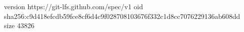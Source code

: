 version https://git-lfs.github.com/spec/v1
oid sha256:c9d418efcdb59fce8cf6d4c9f028708103676f332c1d8cc7076229136ab608dd
size 43826
